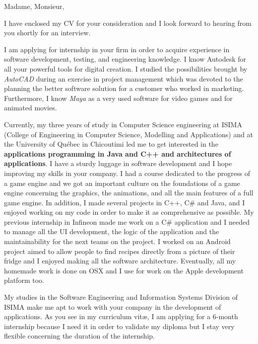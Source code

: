 
\date{\today}
\opening{Madame, Monsieur,}
\closing{I have enclosed my CV for your consideration and I look forward to hearing from you shortly for an interview.}

\makelettertitle

I am applying for internship in your firm in order to acquire experience in software development, testing, and engineering knowledge. I know Autodesk for all your powerful tools for digital creation. I studied the possibilities brought by \textit{AutoCAD} during an exercise in project management which was devoted to the planning the better software solution for a customer who worked in marketing. Furthermore, I know \textit{Maya} as a very used software for video games and for animated movies.

Currently, my three years of study in Computer Science engineering at ISIMA (College of Engineering in Computer Science, Modelling and Applications) and at the University of Québec in Chicoutimi led me to get interested in the \textbf{applications programming in Java and C++ and architectures of applications}. I have a sturdy luggage in software development and I hope improving my skills in your company. I had a course dedicated to the progress of a game engine and we got an important culture on the foundations of a game engine concerning the graphics, the animations, and all the main features of a full game engine. In addition, I made several projects in C++, C\# and Java, and I enjoyed working on my code in order to make it as comprehensive as possible. My previous internship in Infineon made me work on a C\# application and I needed to manage all the UI development, the logic of the application and the maintainability for the next teams on the project. I worked on an Android project aimed to allow people to find recipes directly from a picture of their fridge and I enjoyed making all the software architecture. Eventually, all my homemade work is done on OSX and I use for work on the Apple development platform too.

My studies in the Software Engineering and Information Systems Division of ISIMA make me apt to work with your company in the development of applications. As you see in my curriculum vit\ae{}, I am applying for a 6-month internship because I need it in order to validate my diploma but I stay very flexible concerning the duration of the internship.

\makeletterclosing
